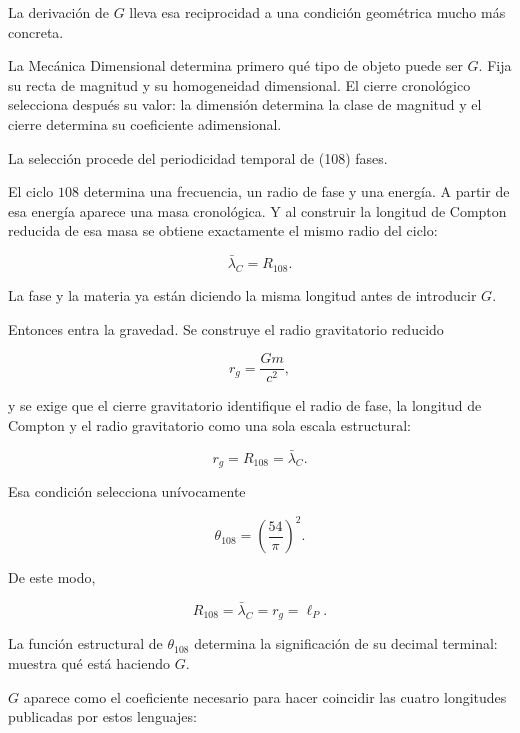 La derivación de \(G\) lleva esa reciprocidad a una condición geométrica mucho más concreta.\par

La Mecánica Dimensional determina primero qué tipo de objeto puede ser \(G\). Fija su recta de magnitud y su homogeneidad dimensional. El cierre cronológico selecciona después su valor: la dimensión determina la clase de magnitud y el cierre determina su coeficiente adimensional.\par

La selección procede del periodicidad temporal de (108) fases.\par

El ciclo \(108\) determina una frecuencia, un radio de fase y una energía. A partir de esa energía aparece una masa cronológica. Y al construir la longitud de Compton reducida de esa masa se obtiene exactamente el mismo radio del ciclo:\par

\[
\bar\lambda_C=R_{108}.
\]

La fase y la materia ya están diciendo la misma longitud antes de introducir \(G\).\par

Entonces entra la gravedad. Se construye el radio gravitatorio reducido\par

\[
r_g=\frac{Gm}{c^2},
\]

y se exige que el cierre gravitatorio identifique el radio de fase, la longitud de Compton y el radio gravitatorio como una sola escala estructural:\par

\[
r_g=R_{108}=\bar\lambda_C.
\]

Esa condición selecciona unívocamente\par

\[
\theta_{108}
=
\left(\frac{54}{\pi}\right)^2.
\]

De este modo,\par

\[
R_{108}
=
\bar\lambda_C
=
r_g
=
\ell_P.
\]

La función estructural de \(\theta_{108}\) determina la significación de su decimal terminal: muestra qué está haciendo \(G\).\par

\(G\) aparece como el coeficiente necesario para hacer coincidir las cuatro longitudes publicadas por estos lenguajes:\par

